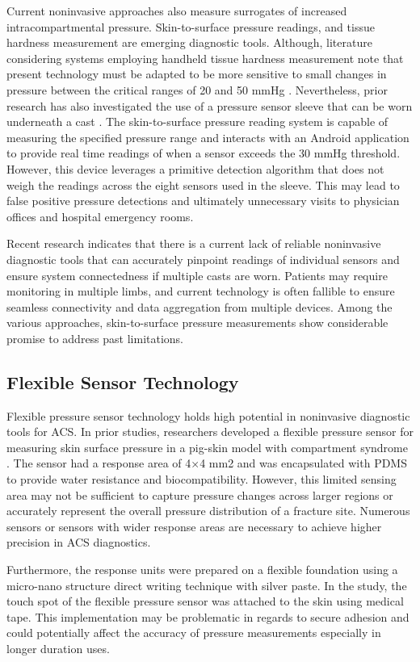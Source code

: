 \documentclass[times, twoside]{zHenriquesLab-StyleBioRxiv}
\begin{document}
Current noninvasive approaches also measure surrogates of increased intracompartmental pressure. Skin-to-surface pressure readings, and tissue hardness measurement are emerging diagnostic tools. Although, literature considering systems employing handheld tissue hardness measurement note that present technology must be adapted to be more sensitive to small changes in pressure between the critical ranges of 20 and 50 mmHg \cite{joseph2006measurement}. Nevertheless, prior research has also investigated the use of a pressure sensor sleeve that can be worn underneath a cast \cite{ferrari2019sensei}. The skin-to-surface pressure reading system is capable of measuring the specified pressure range and interacts with an Android application to provide real time readings of when a sensor exceeds the 30 mmHg threshold. However, this device leverages a primitive detection algorithm that does not weigh the readings across the eight sensors used in the sleeve. This may lead to false positive pressure detections and ultimately unnecessary visits to physician offices and hospital emergency rooms. 

Recent research indicates that there is a current lack of reliable noninvasive diagnostic tools that can accurately pinpoint readings of individual sensors and ensure system connectedness if multiple casts are worn.  Patients may require monitoring in multiple limbs, and current technology is often fallible to ensure seamless connectivity and data aggregation from multiple devices. Among the various approaches, skin-to-surface pressure measurements show considerable promise to address past limitations. 
\subsection*{Flexible Sensor Technology}
Flexible pressure sensor technology holds high potential in noninvasive diagnostic tools for ACS.  In prior studies, researchers developed a flexible pressure sensor for measuring skin surface pressure in a pig-skin model with compartment syndrome \cite{gu2021new}. The sensor had a response area of 4×4 mm2 and was encapsulated with PDMS to provide water resistance and biocompatibility. However, this limited sensing area may not be sufficient to capture pressure changes across larger regions or accurately represent the overall pressure distribution of a fracture site. Numerous sensors or sensors with wider response areas are necessary to achieve higher precision in ACS diagnostics.

Furthermore, the response units were prepared on a flexible foundation using a micro-nano structure direct writing technique with silver paste. In the study, the touch spot of the flexible pressure sensor was attached to the skin using medical tape. This implementation may be problematic in regards to secure adhesion and could potentially affect the accuracy of pressure measurements especially in longer duration uses. 
\end{document}
